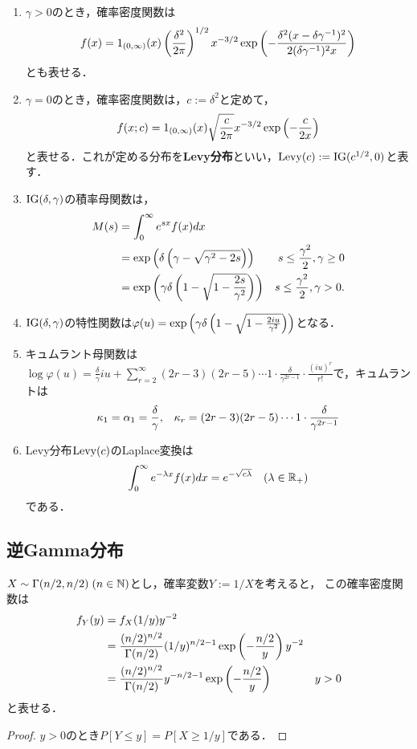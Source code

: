 \documentclass[uplatex,dvipdfmx]{jsreport}
\begin{document}
\begin{lemma}\mbox{}
    \begin{enumerate}
        \item $\gamma>0$のとき，確率密度関数は
        \[f(x)=1_{(0,\infty)}(x)\left(\frac{\delta^2}{2\pi}\right)^{1/2}x^{-3/2}\exp\left(-\frac{\delta^2(x-\delta\gamma^{-1})^2}{2(\delta\gamma^{-1})^2x}\right)\]
        とも表せる．
        \item $\gamma=0$のとき，確率密度関数は，$c:=\delta^2$と定めて，
        \[f(x;c)=1_{(0,\infty)}(x)\sqrt{\frac{c}{2\pi}}x^{-3/2}\exp\left(-\frac{c}{2x}\right)\]
        と表せる．これが定める分布を\textbf{Levy分布}といい，$\mathrm{Levy}(c):=\mathrm{IG}(c^{1/2},0)$と表す．
        \item $\mathrm{IG}(\delta,\gamma)$の積率母関数は，
        \begin{align*}
            M(s)&=\int^\infty_0e^{sx}f(x)dx\\
            &=\exp\left(\delta\left(\gamma-\sqrt{\gamma^2-2s}\right)\right)&s\le\frac{\gamma^2}{2},\gamma\ge0\\
            &=\exp\left(\gamma\delta\left(1-\sqrt{1-\frac{2s}{\gamma^2}}\right)\right)&s\le\frac{\gamma^2}{2},\gamma>0.
        \end{align*}
        \item $\mathrm{IG}(\delta,\gamma)$の特性関数は$\varphi(u)=\exp\left(\gamma\delta\left(1-\sqrt{1-\frac{2iu}{\gamma^2}}\right)\right)$となる．
        \item キュムラント母関数は$\log\varphi(u)=\frac{\delta}{\gamma}iu+\sum^\infty_{r=2}(2r-3)(2r-5)\cdots 1\cdot\frac{\delta}{\gamma^{2r-1}}\cdot\frac{(iu)^r}{r!}$で，キュムラントは
        \begin{align*}
            \kappa_1&=\alpha_1=\frac{\delta}{\gamma},&\kappa_r=(2r-3)(2r-5)\cdots 1\cdot\frac{\delta}{\gamma^{2r-1}}
        \end{align*}
        \item Levy分布$\mathrm{Levy}(c)$のLaplace変換は
        \[\int^\infty_0e^{-\lambda x}f(x)dx=e^{-\sqrt{c\lambda}}\quad(\lambda\in\mathbb{R}_+)\]
        である．
    \end{enumerate}
\end{lemma}

\subsection{逆Gamma分布}

\begin{proposition}
    $X\sim\Gamma(n/2,n/2)\;(n\in\mathbb{N})$とし，確率変数$Y:=1/X$を考えると，
    この確率密度関数は
    \begin{align*}
        f_Y(y)&=f_X(1/y)y^{-2}\\
        &=\frac{(n/2)^{n/2}}{\Gamma(n/2)}(1/y)^{n/2-1}\exp\left(-\frac{n/2}{y}\right)y^{-2}\\
        &=\frac{(n/2)^{n/2}}{\Gamma(n/2)}y^{-n/2-1}\exp\left(-\frac{n/2}{y}\right)&y>0
    \end{align*}
    と表せる．
\end{proposition}
\begin{proof}
    $y>0$のとき$P[Y\le y]=P[X\ge 1/y]$である．
\end{proof}
\end{document}
